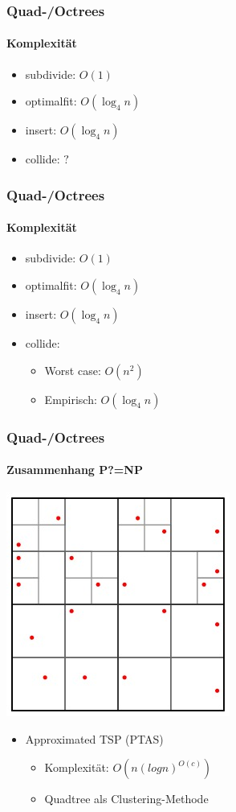 \documentclass{beamer}
\begin{document}
\begin{frame}
  \frametitle{Quad-/Octrees}
  \framesubtitle{Komplexität}
  \begin{itemize}
    \item subdivide: $O(1)$
    \item optimalfit: $O(\log_4 n)$
    \item insert: $O(\log_4 n)$
    \item collide: $?$
  \end{itemize}
\end{frame}

\begin{frame}
  \frametitle{Quad-/Octrees}
  \framesubtitle{Komplexität}
  \begin{itemize}
    \item subdivide: $O(1)$
    \item optimalfit: $O(\log_4 n)$
    \item insert: $O(\log_4 n)$
    \item collide:
    \begin{itemize}
      \item Worst case: $O(n^2)$
      \item Empirisch: $O(\log_4 n)$
    \end{itemize}
  \end{itemize}
\end{frame}

\begin{frame}
  \frametitle{Quad-/Octrees}
  \framesubtitle{Zusammenhang P?=NP}
  \begin{center}
    \includegraphics[scale=0.75]{rsrc/fcarc-march2012-quadtree}
  
    \begin{itemize}
      \item Approximated TSP (PTAS) 
      \begin{itemize}
        \item Komplexität: $O(n {(log n)}^{O(c)})$
        \item Quadtree als Clustering-Methode
      \end{itemize}
    \end{itemize}
  \end{center}
\end{frame}
\end{document}
